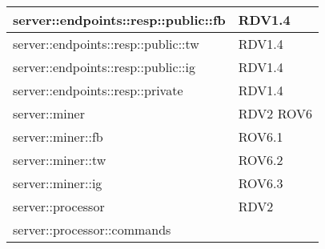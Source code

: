 \begin{center}
\begin{longtable}{| p{9cm} | p{4cm} |}
\hline
server::endpoints::resp::public::fb  &  RDV1.4 \newline\\
\hline
server::endpoints::resp::public::tw  &  RDV1.4 \newline \\
\hline
server::endpoints::resp::public::ig  &  RDV1.4 \newline \\
\hline
server::endpoints::resp::private  &  RDV1.4 \newline \\
\hline
server::miner  & RDV2 \newline ROV6 \newline \\
\hline
server::miner::fb  &  ROV6.1 \newline \\
\hline
server::miner::tw  &  ROV6.2 \newline \\
\hline
server::miner::ig  &  ROV6.3 \newline \\
\hline
server::processor  & RDV2 \newline \\
\hline
server::processor::commands  & \newline \\
\hline

\end{longtable}
\end{center}
